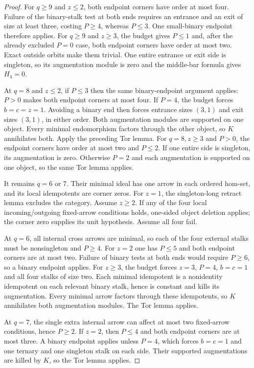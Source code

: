 \begin{proof}
For $q\ge9$ and $z\le2$, both endpoint corners have order at
most four. Failure of the binary-stalk test at both ends requires
an entrance and an exit of size at least three, costing $P\ge4$,
whereas $P\le3$. One small-binary endpoint therefore applies.
For $q\ge9$ and $z\ge3$, the budget gives $P\le1$ and, after
the already excluded $P=0$ case, both endpoint corners have order
at most two. Exact outside orbits make them trivial. One entire
entrance or exit side is singleton, so its augmentation module
is zero and the middle-bar formula gives $H_4=0$.

At $q=8$ and $z\le2$, if $P\le3$ then the same binary-endpoint
argument applies: $P>0$ makes both endpoint corners at most four.
If $P=4$, the budget forces $b=c=z=1$. Avoiding a binary end
then forces entrance sizes $(3,1)$ and exit sizes $(3,1)$, in
either order. Both augmentation modules are supported on one
object. Every minimal endomorphism factors through the other
object, so $K$ annihilates both. Apply the preceding Tor lemma.
For $q=8,z\ge3$ and $P>0$, the endpoint corners have order at
most two and $P\le2$. If one entire side is singleton, its
augmentation is zero. Otherwise $P=2$ and each augmentation is
supported on one object, so the same Tor lemma applies.

It remains $q=6$ or $7$. Their minimal ideal has one arrow in
each ordered hom-set, and its local idempotents are corner zeros.
For $z=1$, the singleton-long retract lemma excludes the category.
Assume $z\ge2$. If any of the four local incoming/outgoing
fixed-arrow conditions holds, one-sided object deletion applies;
the corner zero supplies its unit hypothesis. Assume all four fail.

At $q=6$, all internal cross arrows are minimal, so each of the
four external stalks must be nonsingleton and $P\ge4$.
For $z=2$ one has $P\le5$ and both endpoint corners are at most
two. Failure of binary tests at both ends would require $P\ge6$,
so a binary endpoint applies. For $z\ge3$, the budget forces
$z=3$, $P=4$, $b=c=1$ and all four stalks of size two. Each
minimal idempotent is a nonidentity idempotent on each relevant
binary stalk, hence is constant and kills its augmentation.
Every minimal arrow factors through these idempotents, so $K$
annihilates both augmentation modules. The Tor lemma applies.

At $q=7$, the single extra internal arrow can affect at most two
fixed-arrow conditions, hence $P\ge2$. If $z=2$, then $P\le4$
and both endpoint corners are at most three. A binary endpoint
applies unless $P=4$, which forces $b=c=1$ and one ternary and
one singleton stalk on each side. Their supported augmentations
are killed by $K$, so the Tor lemma applies.


\end{proof}
